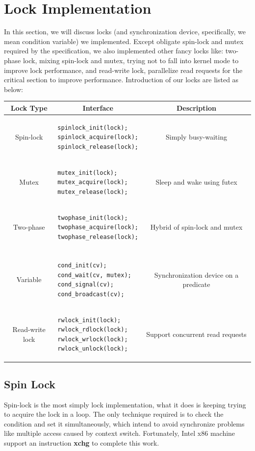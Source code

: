 \documentclass{article}
\begin{document}
\section{Lock Implementation}
In this section, we will discuss locks (and synchronization device, specifically, we mean condition variable) we implemented. Except obligate spin-lock and mutex required by the specification, we also implemented other fancy locks like: two-phase lock, mixing spin-lock and mutex, trying not to fall into kernel mode to improve lock performance, and read-write lock, parallelize read requests for the critical section to improve performance. Introduction of our locks are listed as below:
\begin{center}
\begin{tabular}{c|l|c}
\hline
Lock Type& \multicolumn{1}{c|}{Interface}& Description\\
\hline
Spin-lock&
\begin{lstlisting}
spinlock_init(lock);
spinlock_acquire(lock);
spinlock_release(lock);
\end{lstlisting}
& Simply busy-waiting\\
\hline
Mutex& 
\begin{lstlisting}
mutex_init(lock);
mutex_acquire(lock);
mutex_release(lock);
\end{lstlisting}
& Sleep and wake using futex\\
\hline
Two-phase&
\begin{lstlisting}
twophase_init(lock);
twophase_acquire(lock);
twophase_release(lock);
\end{lstlisting}
& Hybrid of spin-lock and mutex\\
\hline
\incell{Condition\\Variable}&
\begin{lstlisting}
cond_init(cv);
cond_wait(cv, mutex);
cond_signal(cv);
cond_broadcast(cv);
\end{lstlisting}
& Synchronization device on a predicate\\
\hline
Read-write lock&
\begin{lstlisting}
rwlock_init(lock);
rwlock_rdlock(lock);
rwlock_wrlock(lock);
rwlock_unlock(lock);
\end{lstlisting}
& Support concurrent read requests\\
\hline
\end{tabular}
\end{center}

\subsection{Spin Lock}
Spin-lock is the most simply lock implementation, what it does is keeping trying to acquire the lock in a loop. The only technique required is to check the condition and set it simultaneously, which intend to avoid synchronize problems like multiple access caused by context switch. Fortunately, Intel x86 machine support an instruction \textbf{xchg} to complete this work.
\end{document}
